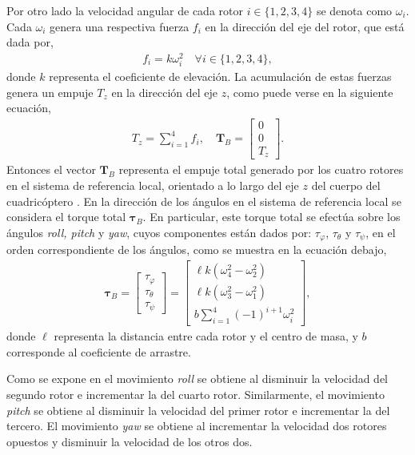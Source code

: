 Por otro lado la velocidad angular de cada rotor $i\in \{1, 2, 3, 4\}$ se denota como $\omega_i$. Cada $\omega_i$ genera una respectiva fuerza $f_i$ en la dirección del eje del rotor, que está dada por,
\begin{align}
    f_i = k\omega_{i}^2 \quad \forall i \in \{1, 2, 3, 4\},
\end{align}
donde $k$ representa el coeficiente de elevación. La acumulación de estas fuerzas genera un empuje $T_{z}$ en la dirección del eje $z$, como puede verse en la siguiente ecuación,
\begin{align}
T_z = \sum_{i=1}^{4}f_i, \quad \mathbf{T}_{B} = 
\begin{bmatrix}
0 \\
0 \\
T_z
\end{bmatrix}.
\label{eq:lift}
\end{align}
Entonces el vector $\mathbf{T}_{B}$ representa el empuje total generado por los cuatro rotores en el sistema de referencia local, orientado a lo largo del eje $z$ del cuerpo del cuadricóptero \cite{luukkonen_2011}.
En la dirección de los ángulos en el sistema de referencia local se considera el torque total $\bm{\tau}_{B}$. En particular, este torque total se efectúa sobre los ángulos \textit{roll, pitch} y \textit{yaw}, cuyos componentes están dados por: $\tau_{\varphi}$, $\tau_{\theta}$ y $\tau_{\psi}$, en el orden correspondiente de los ángulos, como se muestra en la ecuación debajo, 
\begin{align}
    \bm{\tau}_{B} = 
    \begin{bmatrix}
        \tau_{\varphi} \\
        \tau_{\theta} \\
        \tau_{\psi}
    \end{bmatrix}
    = 
    \begin{bmatrix}
        \ell k (\omega_{4}^2 - \omega_2^{2}) \\
        \ell k (\omega_{3}^2 - \omega_1^{2}) \\
        b \sum_{i=1}^{4} (-1)^{i+1} \omega_{i}^2
    \end{bmatrix} 
    \label{eq:torque},
\end{align}
donde $\ell$ representa la distancia entre cada rotor y el centro de masa, y $b$ corresponde al coeficiente de arrastre. \cite{luukkonen_2011} 

Como se expone en \cite{luukkonen_2011} el movimiento \textit{roll} se obtiene al disminuir la velocidad del segundo rotor e incrementar la del cuarto rotor. Similarmente, el movimiento \textit{pitch} se obtiene al disminuir la velocidad del primer rotor e incrementar la del tercero. El movimiento \textit{yaw} se obtiene al incrementar la velocidad dos rotores opuestos y disminuir la velocidad de los otros dos.

